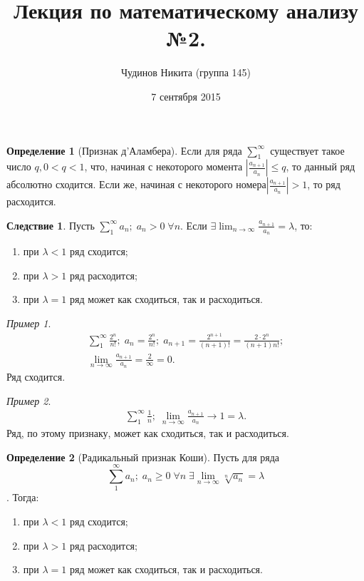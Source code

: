 \documentclass[a4paper,12pt]{article}
\theoremstyle{remark}
\newtheorem*{example}{Пример}
\theoremstyle{definition}
\newtheorem{definition}{Определение}
\newtheorem*{effect}{Следствие}
\begin{document}
\sloppy
\author{Чудинов Никита (группа 145)}
\date{7 сентября 2015}
\title{\vspace{-2.0cm}Лекция по математическому анализу №2.}
\frenchspacing
 
\maketitle


\begin{definition}[Признак д'Аламбера]
	Если для ряда \(\sum_{1}^{\infty}\) существует такое число \(q, {0 < q < 1}\), что, начиная с некоторого момента \(\left| \frac{a_{n+1}}{a_n}\right| \leqslant q \), то данный ряд абсолютно сходится. Если же, начиная с некоторого номера\(\left| \frac{a_{n+1}}{a_n}\right| > 1\), то ряд расходится.
\end{definition}

\begin{effect}
	Пусть \(\sum_{1}^{\infty} a_n;\; a_n > 0 \;\forall n\).
	Если \(\exists \lim_{n \rightarrow \infty} \frac{a_{n+1}}{a_n} = \lambda\), то:
	\begin{enumerate}
		\item при \(\lambda < 1\) ряд сходится;
		\item при \(\lambda > 1\) ряд расходится;
		\item при \(\lambda = 1\) ряд может как сходиться, так и расходиться.
	\end{enumerate}
\end{effect}

\begin{example}
	\begin{gather*}
		\sum_1^\infty \frac{2^n}{n!};\; a_n = \frac{2^n}{n!};\; a_{n+1} = \frac{2^{n+1}}{(n + 1)!} = \frac{2 \cdot 2^n}{(n + 1)n!}; \\
		\lim_{n \rightarrow \infty} \frac{a_{n+1}}{a_n} = \frac{2}{\infty} = 0.
	\end{gather*}
	Ряд сходится.
\end{example}

\begin{example}
	\begin{gather*}
		\sum_1^\infty \frac{1}{n};\; \lim_{n \rightarrow \infty} \frac{a_{n+1}}{a_n} \rightarrow 1 = \lambda.
	\end{gather*}
	Ряд, по этому признаку, может как сходиться, так и расходиться.
\end{example}

\begin{definition}[Радикальный признак Коши]
	Пусть для ряда \[\sum_1^{\infty} a_n;\; a_n \geqslant 0 \;\forall n \;\exists \lim_{n \rightarrow \infty} \sqrt[n]{a_n} = \lambda\].
	Тогда:
	\begin{enumerate}
		\item при \(\lambda < 1\) ряд сходится;
		\item при \(\lambda > 1\) ряд расходится;
		\item при \(\lambda = 1\) ряд может как сходиться, так и расходиться.
	\end{enumerate}
\end{definition}
\end{document}
